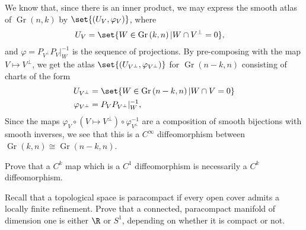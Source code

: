 \documentclass[10pt]{mypackage}
\begin{document}
\begin{solution}
  We know that, since there is an inner product, we may express the smooth atlas of $\operatorname{Gr}\left( n,k \right)$ by $\set{\left( U_V,\varphi_V \right)}$, where
  \begin{align*}
    U_V &= \set{W\in \operatorname{Gr}\left( k,n \right) | W\cap V^{\perp} = 0},
  \end{align*}
  and $\varphi = P_{V^{\perp}} P_{V}|_{W}^{-1}$ is the sequence of projections. By pre-composing with the map $V\mapsto V^{\perp}$, we get the atlas $\set{\left( U_{V^{\perp}},\varphi_{V^{\perp}} \right)}$ for $\operatorname{Gr}\left( n-k,n \right)$ consisting of charts of the form
  \begin{align*}
    U_{V^{\perp}} &= \set{W\in \operatorname{Gr}\left( n-k,n \right) | W\cap V = 0}\\
    \varphi_{V^{\perp}} &= P_{V}P_{V^{\perp}}|_{W}^{-1},
  \end{align*}
  Since the maps $\varphi_{V}\circ \left( V\mapsto V^{\perp} \right)\circ \varphi_{V^{\perp}}^{-1}$ are a composition of smooth bijections with smooth inverses, we see that this is a $C^{\infty}$ diffeomorphism between $\operatorname{Gr}\left( k,n \right) \cong \operatorname{Gr}\left( n-k,n \right)$.
\end{solution}
\begin{problem}[Problem 3]
  Prove that a $C^{k}$ map which is a $C^{1}$ diffeomorphism is necessarily a $C^{k}$ diffeomorphism.
\end{problem}
\begin{problem}[Problem 4]
  Recall that a topological space is paracompact if every open cover admits a locally finite refinement. Prove that a connected, paracompact manifold of dimension one is either $\R$ or $S^{1}$, depending on whether it is compact or not.
\end{problem}
\end{document}
